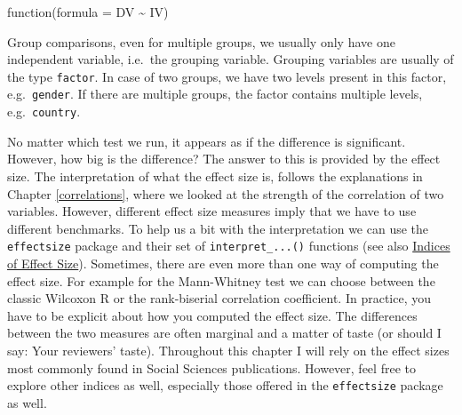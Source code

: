 \documentclass[
]{book}
\newenvironment{Shaded}{\begin{snugshade}}{\end{snugshade}}
\newcommand{\AttributeTok}[1]{\textcolor[rgb]{0.77,0.63,0.00}{#1}}
\newcommand{\CommentTok}[1]{\textcolor[rgb]{0.56,0.35,0.01}{\textit{#1}}}
\newcommand{\ConstantTok}[1]{\textcolor[rgb]{0.00,0.00,0.00}{#1}}
\newcommand{\DocumentationTok}[1]{\textcolor[rgb]{0.56,0.35,0.01}{\textbf{\textit{#1}}}}
\newcommand{\FunctionTok}[1]{\textcolor[rgb]{0.00,0.00,0.00}{#1}}
\newcommand{\NormalTok}[1]{#1}
\newcommand{\OtherTok}[1]{\textcolor[rgb]{0.56,0.35,0.01}{#1}}
\newcommand{\SpecialCharTok}[1]{\textcolor[rgb]{0.00,0.00,0.00}{#1}}
\begin{document}
\leavevmode\hypertarget{formulas-in-functions}{}%
function(formula = DV \textasciitilde{} IV)

Group comparisons, even for multiple groups, we usually only have one independent variable, i.e.~the grouping variable. Grouping variables are usually of the type \texttt{factor}. In case of two groups, we have two levels present in this factor, e.g.~\texttt{gender}. If there are multiple groups, the factor contains multiple levels, e.g.~\texttt{country}.

No matter which test we run, it appears as if the difference is significant. However, how big is the difference? The answer to this is provided by the effect size. The interpretation of what the effect size is, follows the explanations in Chapter \ref{correlations}, where we looked at the strength of the correlation of two variables. However, different effect size measures imply that we have to use different benchmarks. To help us a bit with the interpretation we can use the \texttt{effectsize} package and their set of \texttt{interpret\_...()} functions (see also \href{https://easystats.github.io/effectsize/articles/interpret.html}{Indices of Effect Size}). Sometimes, there are even more than one way of computing the effect size. For example for the Mann-Whitney test we can choose between the classic Wilcoxon R or the rank-biserial correlation coefficient. In practice, you have to be explicit about how you computed the effect size. The differences between the two measures are often marginal and a matter of taste (or should I say: Your reviewers' taste). Throughout this chapter I will rely on the effect sizes most commonly found in Social Sciences publications. However, feel free to explore other indices as well, especially those offered in the \texttt{effectsize} package as well.

\begin{Shaded}
\end{Shaded}
\end{document}
